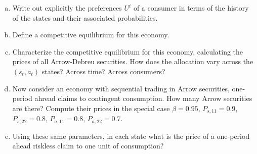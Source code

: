 \documentclass{article}
\newcommand{\sol}[1]{\iftoggle{sol}{{\color{blue} #1 }}{}}
\begin{document}
\begin{enumerate}[(a)]
\item Write out explicitly the preferences $U^i$ of a consumer in
  terms of the history of the states and their associated
  probabilities.
\item Define a competitive equilibrium for this economy.
\item Characterize the competitive equilibrium for this economy,
  calculating the prices of all Arrow-Debreu securities. How does the
  allocation vary across the $(s_t,a_t)$ states? Across time? Across
  consumers?
\item Now consider an economy with sequential trading in Arrow
  securities, one-period ahread claims to contingent consumption. How
  many Arrow securities are there? Compute their prices in the special
  case $\beta=0.95$, $P_{s,11}=0.9$, $P_{s,22}=0.8$, $P_{a,11}=0.8$,
  $P_{a,22}=0.7$.
\item Using these same parameters, in each state what is the price of
  a one-period ahead riskless claim to one unit of consumption?

\end{enumerate}

\sol{

  You can check details in the solution of Problem set 1, but here is
  a general overview of the algoritm.

  Solution relies on a few fundamental results, proven in LS Chapter 8.
  \begin{itemize}
  \item For a particular choice of prices date-0 trade (Arrow-Debreu)
    market equilibrium allocation is the same as in secquential
    (Arrow) market equilibrium.
  \item AD equilibrium is Pareto efficient.
  \item Solution to a social planner's problem is Pareto efficient.
  \end{itemize}

  \emph{Negishi algorithm} uses these results to solve for competitive
  equilibrium:
  \begin{enumerate}
  \item Solve social planner's problem with a set of Pareto
    weights. Solution is an Pareto efficient consumption sequence that
    depends on chosen weights.
  \item We know that \emph{one} of all possible Pareto efficient
    allocations coincides with AD market equilibrium. To select such
    allocation, we need to pick particular Pareto weights which will
    satisfy a feature of markets, budget constraint, and be consistent
    with household optimization. In addition, one price can be
    normalized to 1 (typically, price at time 0 and state 0. Once we
    found such weights, we can compute AD equilibrium.
  \item Sequential markets equilibrium has the same allocation as AD
    equilibrium and prices $q_{t+1}^t=q_{t+1}^0 / q_t^0$.
  \end{enumerate}

}
\end{document}
